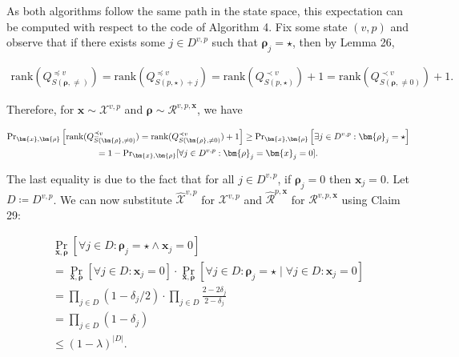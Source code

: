 \documentclass[10pt,a4paper]{article}
\begin{document}
As both algorithms follow the same path in the state space, this expectation can be computed with respect to the code of Algorithm 4. Fix some state $(v,p)$ and observe that if there exists some $j\in D^{v,p}$ such that $\bm{\rho}_{j}=\star$, then by Lemma 26,\par


\[\begin{gathered}
\mathrm{rank}(Q^{\preceq v}_{S({\bm{\rho}},\neq)})=\mathrm{rank}(Q^{\preceq v}_{S(p,\star)+j})=\mathrm{rank}(Q^{\prec v}_{S(p,\star)})+1=\mathrm{rank}(Q^{\prec v}_{S(\bm{\rho},\neq 0)})+1.
\end{gathered}\]


Therefore, for $\bm{x}\sim\mathcal{X}^{v,p}$ and $\bm{\rho}\sim\mathcal{R}^{v,p,\bm{x}}$, we have\par


\[\begin{gathered}
\displaystyle\Pr\nolimits_{\bm{x},\bm{\rho}}\Big{[}\mathrm{rank}(Q^{\preceq v}_{S(\bm{\rho},\neq 0)})=\mathrm{rank}(Q^{\prec v}_{S(\bm{\rho},\neq 0)})+1\Big{]} \displaystyle\geq\Pr\nolimits_{\bm{x},\bm{\rho}}\left[\exists j\in D^{v,p}:\bm{\rho}_{j}=\star\right] \\
\displaystyle=1-\Pr\nolimits_{\bm{x},\bm{\rho}}[\forall j\in D^{v,p}:\bm{\rho}_{j}=\bm{x}_{j}=0].
\end{gathered}\]


The last equality is due to the fact that for all $j\in D^{v,p}$, if $\bm{\rho}_{j}=0$ then $\bm{x}_{j}=0$. Let $D\coloneqq D^{v,p}$. We can now substitute $\widehat{\mathcal{X}}^{v,p}$ for $\mathcal{X}^{v,p}$ and $\widehat{\mathcal{R}}^{p,\bm{x}}$ for $\mathcal{R}^{v,p,\bm{x}}$ using Claim 29:\par


\[\begin{gathered}
\displaystyle\Pr_{\bm{x},\bm{\rho}}[\forall j\in D\colon\bm{\rho}_{j}=\star\land\bm{x}_{j}=0] \\
\displaystyle= \displaystyle\Pr_{\bm{x},\bm{\rho}}[\forall j\in D\colon\bm{x}_{j}=0]\cdot\Pr_{\bm{x},\bm{\rho}}[\forall j\in D\colon\bm{\rho}_{j}=\star\mid\forall j\in D\colon\bm{x}_{j}=0] \\
\displaystyle= \displaystyle\prod\nolimits_{j\in D}(1-\delta_{j}/2)\cdot\prod\nolimits_{j\in D}\frac{2-2\delta_{j}}{2-\delta_{j}} \\
\displaystyle= \displaystyle\prod\nolimits_{j\in D}(1-\delta_{j}) \\
\displaystyle\leq \displaystyle(1-\lambda)^{|D|}.
\end{gathered}\]
\end{document}

